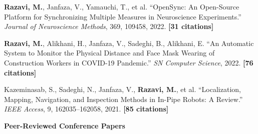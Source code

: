 \documentclass[11pt,letterpaper]{article}
\begin{document}
{\begin{etaremune}[leftmargin=0.6cm, itemsep=0.12cm, topsep=0.08cm]
\item \textbf{Razavi, M.}, Janfaza, V., Yamauchi, T., et al. ``OpenSync: An Open-Source Platform for Synchronizing Multiple Measures in Neuroscience Experiments.'' \textit{Journal of Neuroscience Methods}, 369, 109458, 2022. \textbf{[31 citations]}

\item \textbf{Razavi, M.}, Alikhani, H., Janfaza, V., Sadeghi, B., Alikhani, E. ``An Automatic System to Monitor the Physical Distance and Face Mask Wearing of Construction Workers in COVID-19 Pandemic.'' \textit{SN Computer Science}, 2022. \textbf{[76 citations]}

\item Kazeminasab, S., Sadeghi, N., Janfaza, V., \textbf{Razavi, M.}, et al. ``Localization, Mapping, Navigation, and Inspection Methods in In-Pipe Robots: A Review.'' \textit{IEEE Access}, 9, 162035--162058, 2021. \textbf{[85 citations]}

\end{etaremune}
}
\vspace{0.2em}

\noindent\textbf{\color{headerblue}Peer-Reviewed Conference Papers}\\[0.15em]
\end{document}
